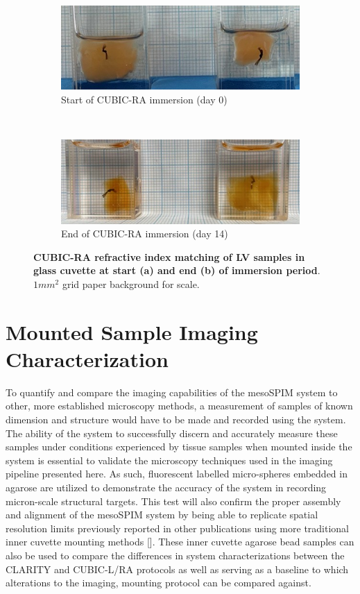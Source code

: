 \begin{figure}[H]
    \centering
    \begin{subfigure}[t]{0.5\textwidth}
        \centering
        \includegraphics[width=0.8\linewidth]{Images/PreRA.jpg}
        \caption{Start of CUBIC-RA immersion (day 0)}
    \end{subfigure}%
    ~ 
    \begin{subfigure}[t]{0.5\textwidth}
        \centering
        \includegraphics[width=0.8\linewidth]{Images/PostRA.jpg}
        \caption{End of CUBIC-RA immersion (day 14)}
    \end{subfigure}
    \caption{\textbf{CUBIC-RA refractive index matching of LV samples in glass cuvette at start (a) and end (b) of immersion period}. $1mm^2$ grid paper background for scale.}
\end{figure}

\section{Mounted Sample Imaging Characterization}

To quantify and compare the imaging capabilities of the mesoSPIM system to other, more established microscopy methods, a measurement of samples of known dimension and structure would have to be made and recorded using the system. The ability of the system to successfully discern and accurately measure these samples under conditions experienced by tissue samples when mounted inside the system is essential to validate the microscopy techniques used in the imaging pipeline presented here. As such, fluorescent labelled micro-spheres embedded in agarose are utilized to demonstrate the accuracy of the system in recording micron-scale structural targets. This test will also confirm the proper assembly and alignment of the mesoSPIM system  by being able to replicate spatial resolution limits previously reported in other publications using more traditional inner cuvette mounting methods []. These inner cuvette agarose bead samples can also be used to compare the differences in system characterizations between the CLARITY and CUBIC-L/RA protocols as well as serving as a baseline to which alterations to the imaging, mounting protocol can be compared against.

